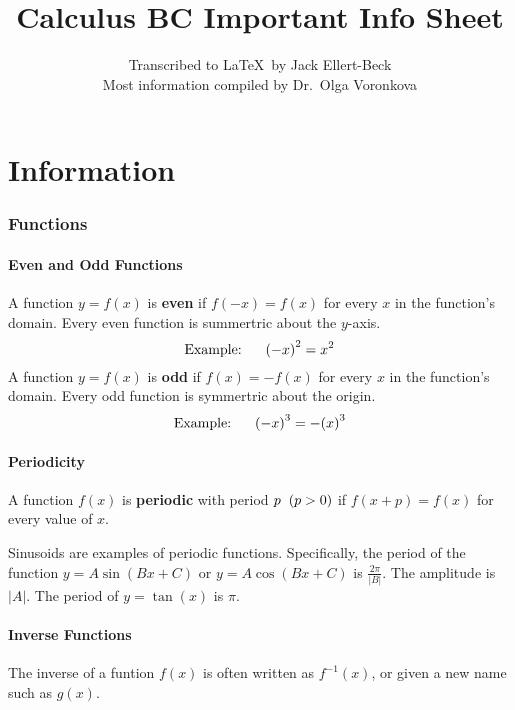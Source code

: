 \documentclass{artikel3}
\begin{document}
\title{Calculus BC Important Info Sheet}
\author{Transcribed to \LaTeX\ by Jack Ellert-Beck\\ 
Most information compiled by Dr.\ Olga Voronkova}
\maketitle

\newpage

\tableofcontents

\newpage

\part{Information}

\section{Functions}

\subsection{Even and Odd Functions}
A function $y=f(x)$ is \textbf{even} if $f(-x)=f(x)$ for every $x$ 
in the function's domain. Every even function is summertric about 
the $y$-axis. 
\[\text{Example:}\hspace{6 mm} {(-x)}^2=x^2 \]
A function $y=f(x)$ is \textbf{odd} if $f(x)=-f(x)$ for every $x$ 
in the function's domain. Every odd function is symmertric about 
the origin. 
\[\text{Example:}\hspace{6 mm} {(-x)}^3=-{(x)}^3 \]

\subsection{Periodicity}
A function $f(x)$ is \textbf{periodic} with period $p\hspace{2 mm}(p>0)$ if 
$f(x+p)=f(x)$ for every value of $x$.

Sinusoids are examples of periodic functions. Specifically, the period
of the function $y=A\sin(Bx+C)$ or $y=A\cos(Bx+C)$ is $\frac{2\pi}{|B|}$.
The amplitude is $|A|$. The period of $y=\tan(x)$ is $\pi$.

\subsection{Inverse Functions}
The inverse of a funtion $f(x)$ is often written as $f^{-1}(x)$, or given 
a new name such as $g(x)$.
\end{document}
